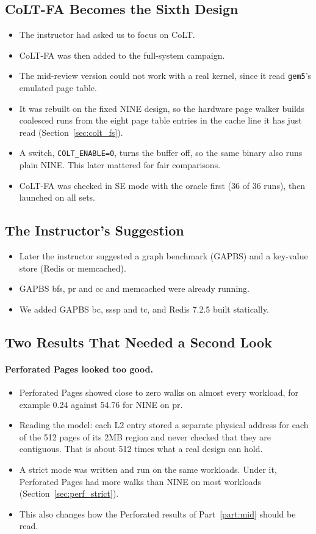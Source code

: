 \subsection{CoLT-FA Becomes the Sixth Design}
\begin{itemize}
    \item The instructor had asked us to focus on CoLT.
    \item CoLT-FA was then added to the full-system campaign.
    \item The mid-review version could not work with a real kernel, since it read \texttt{gem5}'s emulated page table.
    \item It was rebuilt on the fixed NINE design, so the hardware page walker builds coalesced runs from the eight page table entries in the cache line it has just read (Section~\ref{sec:colt_fs}).
    \item A switch, \texttt{COLT\_ENABLE=0}, turns the buffer off, so the same binary also runs plain NINE. This later mattered for fair comparisons.
    \item CoLT-FA was checked in SE mode with the oracle first (36 of 36 runs), then launched on all sets.
\end{itemize}

\subsection{The Instructor's Suggestion}
\begin{itemize}
    \item Later the instructor suggested a graph benchmark (GAPBS) and a key-value store (Redis or memcached).
    \item GAPBS bfs, pr and cc and memcached were already running.
    \item We added GAPBS bc, sssp and tc, and Redis 7.2.5 built statically.
\end{itemize}

\subsection{Two Results That Needed a Second Look}
\paragraph{Perforated Pages looked too good.}
\begin{itemize}
    \item Perforated Pages showed close to zero walks on almost every workload, for example 0.24 against 54.76 for NINE on pr.
    \item Reading the model: each L2 entry stored a separate physical address for each of the 512 pages of its 2MB region and never checked that they are contiguous. That is about 512 times what a real design can hold.
    \item A strict mode was written and run on the same workloads. Under it, Perforated Pages had more walks than NINE on most workloads (Section~\ref{sec:perf_strict}).
    \item This also changes how the Perforated results of Part~\ref{part:mid} should be read.
\end{itemize}

